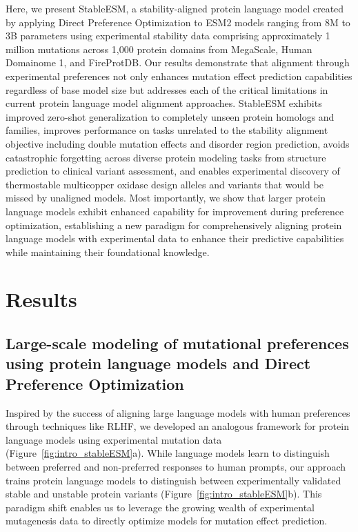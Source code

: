 \documentclass[]{fairmeta}
\begin{document}
Here, we present StableESM, a stability-aligned protein language model created by applying Direct Preference Optimization to ESM2 models ranging from 8M to 3B parameters using experimental stability data comprising approximately 1 million mutations across 1,000 protein domains from MegaScale, Human Domainome 1, and FireProtDB. Our results demonstrate that alignment through experimental preferences not only enhances mutation effect prediction capabilities regardless of base model size but addresses each of the critical limitations in current protein language model alignment approaches. StableESM exhibits improved zero-shot generalization to completely unseen protein homologs and families, improves performance on tasks unrelated to the stability alignment objective including double mutation effects and disorder region prediction, avoids catastrophic forgetting across diverse protein modeling tasks from structure prediction to clinical variant assessment, and enables experimental discovery of thermostable multicopper oxidase design alleles and variants that would be missed by unaligned models. Most importantly, we show that larger protein language models exhibit enhanced capability for improvement during preference optimization, establishing a new paradigm for comprehensively aligning protein language models with experimental data to enhance their predictive capabilities while maintaining their foundational knowledge.


\section{Results}\label{sec:prelim_generative_models}

\subsection{Large-scale modeling of mutational preferences using protein language models and Direct Preference Optimization}

Inspired by the success of aligning large language models with human preferences through techniques like RLHF, we developed an analogous framework for protein language models using experimental mutation data (Figure~\ref{fig:intro_stableESM}a). While language models learn to distinguish between preferred and non-preferred responses to human prompts, our approach trains protein language models to distinguish between experimentally validated stable and unstable protein variants (Figure~\ref{fig:intro_stableESM}b). This paradigm shift enables us to leverage the growing wealth of experimental mutagenesis data to directly optimize models for mutation effect prediction.
\end{document}
